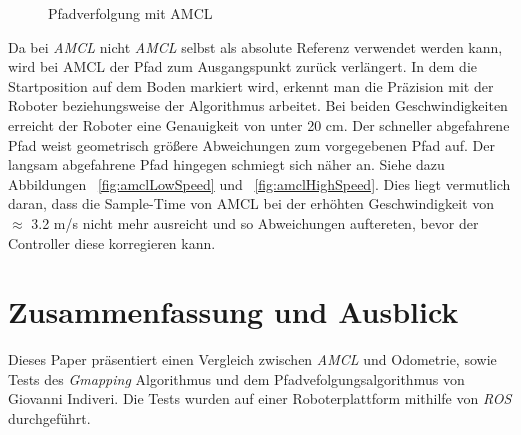\documentclass[11pt,a4paper]{article}
\begin{document}
{\begin{figure}[h]
	\centering
	\caption{Pfadverfolgung mit AMCL}
\end{figure}

Da bei \textit{AMCL} nicht \textit{AMCL} selbst als absolute Referenz verwendet werden kann, wird bei AMCL der Pfad zum Ausgangspunkt zur\"uck verl\"angert. In dem die Startposition auf dem Boden markiert wird, erkennt man die Pr\"azision mit der Roboter beziehungsweise der Algorithmus arbeitet.
Bei beiden Geschwindigkeiten erreicht der Roboter eine Genauigkeit von unter 20 cm. Der schneller abgefahrene Pfad weist geometrisch gr\"o{\ss}ere Abweichungen zum vorgegebenen Pfad auf. Der langsam abgefahrene Pfad hingegen schmiegt sich n\"aher an. Siehe dazu Abbildungen ~\ref{fig:amclLowSpeed} und ~\ref{fig:amclHighSpeed}.  
Dies liegt vermutlich daran, dass die Sample-Time von AMCL bei der erh\"ohten Geschwindigkeit  von $\approx$ 3.2 m/s nicht mehr ausreicht und so Abweichungen auftereten, bevor der Controller diese korregieren kann. 

\section{Zusammenfassung und Ausblick}

Dieses Paper pr\"asentiert einen Vergleich zwischen \textit{AMCL} und Odometrie, sowie Tests des \textit{Gmapping} Algorithmus und dem Pfadvefolgungsalgorithmus von Giovanni Indiveri. Die Tests wurden auf einer Roboterplattform mithilfe von \textit{ROS} durchgef\"uhrt. 


}
\end{document}
